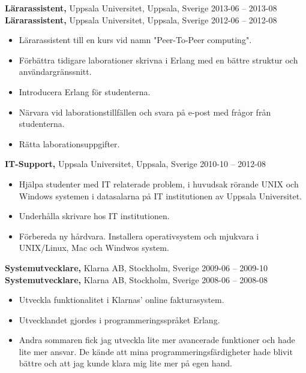 \documentclass[margin]{res}
\begin{document}
\begin{resume}
{\bf Lärarassistent,} Uppsala Universitet, Uppsala, Sverige \hfill 2013-06 -- 2013-08\\
{\bf Lärarassistent,} Uppsala Universitet, Uppsala, Sverige \hfill 2012-06 -- 2012-08
 \begin{itemize} \itemsep -2pt  %
 \item Lärarassistent till en kurs vid namn "Peer-To-Peer computing".
 \item Förbättra tidigare laborationer skrivna i Erlang med en bättre struktur och användargränssnitt.
 \item Introducera Erlang för studenterna.
 \item Närvara vid laborationstillfällen och svara på e-post med frågor från studenterna.
 \item Rätta laborationsuppgifter.
 \end{itemize}

{\bf IT-Support,} Uppsala Universitet, Uppsala, Sverige \hfill 2010-10 -- 2012-08
 \begin{itemize} \itemsep -2pt  %
 \item Hjälpa studenter med IT relaterade problem, i huvudsak rörande UNIX och Windows systemen i datasalarna på IT institutionen av Uppsala Universitet.
 \item Underhålla skrivare hos IT institutionen.
 \item Förbereda ny hårdvara. Installera operativsystem och mjukvara i UNIX/Linux, Mac och Windwos system.
 \end{itemize}

{\bf Systemutvecklare,} Klarna AB, Stockholm, Sverige \hfill 2009-06 -- 2009-10\\
{\bf Systemutvecklare,} Klarna AB, Stockholm, Sverige \hfill 2008-06 -- 2008-08
 \begin{itemize} \itemsep -2pt  %
 \item Utveckla funktionalitet i Klarnas' online fakturasystem.
 \item Utvecklandet gjordes i programmeringsspråket Erlang.
 \item Andra sommaren fick jag utveckla lite mer avancerade funktioner och hade lite mer ansvar. De kände att mina programmeringsfärdigheter hade blivit bättre och att jag kunde klara mig lite mer på egen hand.
 \end{itemize}

\newpage


\end{resume}
\end{document}
